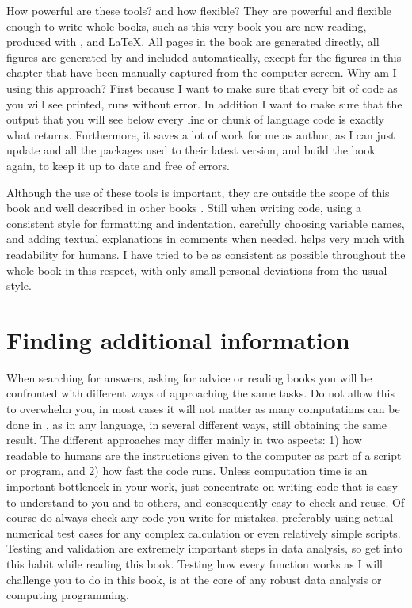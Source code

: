 \documentclass[krantz2]{krantz}\usepackage{knitr}%
\begin{document}
How powerful are these tools? and how flexible? They are powerful and flexible enough to write whole books, such as this very book you are now reading, produced with \Rpgrm,  and \LaTeX{}. All pages in the book are generated directly, all figures are generated by \Rpgrm and included automatically, except for the figures in this chapter that have been manually captured from the computer screen. Why am I using this approach? First because I want to make sure that every bit of code as you will see printed, runs without error. In addition I want to make sure that the output that you will see below every line or chunk of \Rlang language code is exactly what \Rpgrm returns. Furthermore, it saves a lot of work for me as author, as I can just update \Rpgrm and all the packages used to their latest version, and build the book again, to keep it up to date and free of errors.

Although the use of these tools is important, they are outside the scope of this book and well described in other books \autocite{Gandrud2015,Xie2013}. Still when writing code, using a consistent style for formatting and indentation, carefully choosing variable names, and adding textual explanations in comments when needed, helps very much with readability for humans. I have tried to be as consistent as possible throughout the whole book in this respect, with only small personal deviations from the usual style.

\section{Finding additional information}

When searching for answers, asking for advice or reading books you will be confronted with different ways of approaching the same tasks. Do not allow this to overwhelm you, in most cases it will not matter as many computations can be done in \Rpgrm, as in any language, in several different ways, still obtaining the same result. The different approaches may differ mainly in two aspects: 1) how readable to humans are the instructions given to the computer as part of a script or program, and 2) how fast the code runs. Unless computation time is an important bottleneck in your work, just concentrate on writing code that is easy to understand to you and to others, and consequently easy to check and reuse. Of course do always check any code you write for mistakes, preferably using actual numerical test cases for any complex calculation or even relatively simple scripts. Testing and validation are extremely important steps in data analysis, so get into this habit while reading this book. Testing how every function works as I will challenge you to do in this book, is at the core of any robust data analysis or computing programming.
\end{document}
